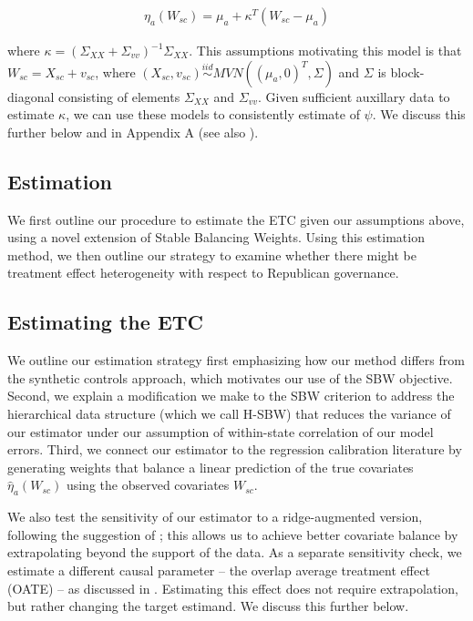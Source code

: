 \documentclass[aoas]{imsart}
\theoremstyle{plain}
\theoremstyle{remark}
\begin{document}
\begin{align*}
\eta_a(W_{sc}) = \mu_a + \kappa^T(W_{sc} - \mu_a)
\end{align*}

where $\kappa = (\Sigma_{XX} + \Sigma_{vv})^{-1}\Sigma_{XX}$. This assumptions motivating this model is that $W_{sc} = X_{sc} + v_{sc}$, where $(X_{sc}, v_{sc}) \stackrel{iid}\sim MVN((\mu_a, 0)^T, \Sigma)$ and $\Sigma$ is block-diagonal consisting of elements $\Sigma_{XX}$ and $\Sigma_{vv}$. Given sufficient auxillary data to estimate $\kappa$, we can use these models to consistently estimate of $\psi$. We discuss this further below and in Appendix A (see also \cite{gleser1992importance}).

\subsection{Estimation}

We first outline our procedure to estimate the ETC given our assumptions above, using a novel extension of Stable Balancing Weights. Using this estimation method, we then outline our strategy to examine whether there might be treatment effect heterogeneity with respect to Republican governance.

\subsection{Estimating the ETC}

We outline our estimation strategy first emphasizing how our method differs from the synthetic controls approach, which motivates our use of the SBW objective. Second, we explain a modification we make to the SBW criterion to address the hierarchical data structure (which we call H-SBW) that reduces the variance of our estimator under our assumption of within-state correlation of our model errors. Third, we connect our estimator to the regression calibration literature by generating weights that balance a linear prediction of the true covariates $\hat{\eta}_a(W_{sc})$ using the observed covariates $W_{sc}$. 

We also test the sensitivity of our estimator to a ridge-augmented version, following the suggestion of \cite{ben2018augmented}; this allows us to achieve better covariate balance by extrapolating beyond the support of the data. As a separate sensitivity check, we estimate a different causal parameter -- the overlap average treatment effect (OATE) -- as discussed in \cite{li2018balancing}. Estimating this effect does not require extrapolation, but rather changing the target estimand. We discuss this further below.
\end{document}
